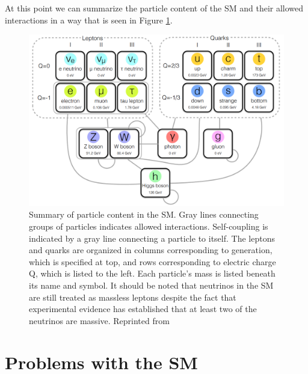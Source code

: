 At this point we can summarize the particle content of the SM and their allowed interactions in a way that is seen in Figure \ref{fig:smcontent}.

\begin{figure}[h]
	\centering
	\includegraphics[width=1.0\linewidth]{Figures/SMcontent}
	\caption[Summary of content of the SM.]{Summary of particle content in the SM. Gray lines connecting groups of particles indicates allowed interactions. Self-coupling is indicated by a gray line connecting a particle to itself. The leptons and quarks are organized in columns corresponding to generation, which is specified at top, and rows corresponding to electric charge Q, which is listed to the left. Each particle's mass is listed beneath its name and symbol. It should be noted that neutrinos in the SM are still treated as massless leptons despite the fact that experimental evidence has established that at least two of the neutrinos are massive. Reprinted from \cite{Iiyama:2015nem}}
	\label{fig:smcontent}
\end{figure}


\section{Problems with the SM}